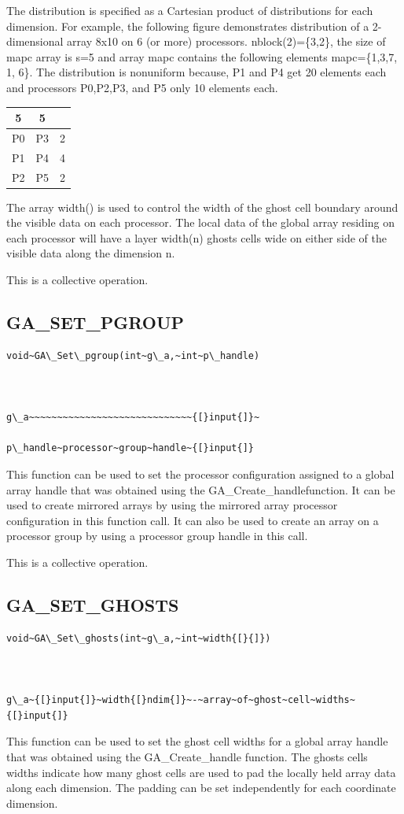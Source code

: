 The distribution is specified as a Cartesian product of distributions
for each dimension. For example, the following figure demonstrates
distribution of a 2-dimensional array 8x10 on 6 (or more) processors.
nblock(2)=\{3,2\}, the size of mapc array is s=5 and array mapc contains
the following elements mapc=\{1,3,7, 1, 6\}. The distribution is nonuniform
because, P1 and P4 get 20 elements each and processors P0,P2,P3, and
P5 only 10 elements each. 

\begin{tabular}{|c|c|c|}
\cline{1-2} 
5 & 5 & \multicolumn{1}{c}{}\tabularnewline
\hline 
P0 & P3 & 2\tabularnewline
\hline 
P1 & P4 & 4\tabularnewline
\hline 
P2 & P5 & 2\tabularnewline
\hline
\end{tabular} 

The array width() is used to control the width of the ghost cell boundary
around the visible data on each processor. The local data of the global
array residing on each processor will have a layer width(n) ghosts
cells wide on either side of the visible data along the dimension
n.

This is a collective operation. 


\subsection*{\label{sub:GA_SET_PGROUP}GA\_SET\_PGROUP}
\begin{verbatim}
void~GA\_Set\_pgroup(int~g\_a,~int~p\_handle)



g\_a~~~~~~~~~~~~~~~~~~~~~~~~~~~~~{[}input{]}~

p\_handle~processor~group~handle~{[}input{]}
\end{verbatim}
This function can be used to set the processor configuration assigned
to a global array handle that was obtained using the GA\_Create\_handlefunction.
It can be used to create mirrored arrays by using the mirrored array
processor configuration in this function call. It can also be used
to create an array on a processor group by using a processor group
handle in this call.

This is a collective operation. 


\subsection*{\label{sub:GA_SET_GHOSTS}GA\_SET\_GHOSTS}
\begin{verbatim}
void~GA\_Set\_ghosts(int~g\_a,~int~width{[}{]})



g\_a~{[}input{]}~width{[}ndim{]}~-~array~of~ghost~cell~widths~{[}input{]}
\end{verbatim}
This function can be used to set the ghost cell widths for a global
array handle that was obtained using the GA\_Create\_handle function.
The ghosts cells widths indicate how many ghost cells are used to
pad the locally held array data along each dimension. The padding
can be set independently for each coordinate dimension.

